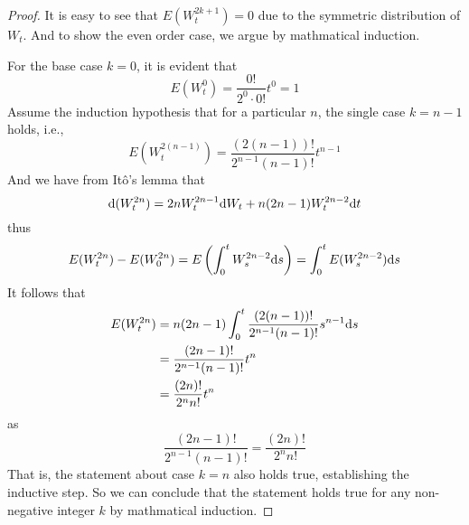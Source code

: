 \documentclass{homework}
\begin{document}
    \problem
    \begin{proof}
        It is easy to see that $E(W_t^{2k+1})=0$ due to the symmetric distribution
        of $W_t$. And to show the even order case, we argue by mathmatical induction.

        For the base case $k=0$, it is evident that
        \[E(W_t^0)=\frac{0!}{2^0\cdot 0!}t^0=1\]
        Assume the induction hypothesis that for a particular $n$, the
        single case $k=n-1$ holds, i.e.,
        \[E(W_t^{2(n-1)})=\frac{(2(n-1))!}{2^{n-1}(n-1)!}t^{n-1}\]
        And we have from It\^o's lemma that
        \[\mathrm d (W_t^{2n})=2nW_t^{2n-1}\mathrm d W_t+n(2n-1)W_t^{2n-2}\mathrm d t\]
        thus
        \[E(W_t^{2n})-E(W_0^{2n})=E\left(\int_0^tW_s^{2n-2}\mathrm d s\right)
        =\int_0^tE(W_s^{2n-2})\mathrm d s\]
        It follows that
        \[\begin{aligned}
            E(W_t^{2n})&=n(2n-1)\int_0^t\frac{(2(n-1))!}{2^{n-1}(n-1)!}s^{n-1}\mathrm d s\\
            &=\frac{(2n-1)!}{2^{n-1}(n-1)!}t^n\\
            &=\frac{(2n)!}{2^nn!}t^n
        \end{aligned}\]
        as
        \[\frac{(2n-1)!}{2^{n-1}(n-1)!}=\frac{(2n)!}{2^nn!}\]
        That is, the statement about case $k=n$ also holds true, establishing
        the inductive step.
        So we can conclude that the statement holds true for any non-negative integer $k$
        by mathmatical induction.

    \end{proof}
\end{document}
